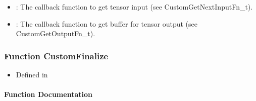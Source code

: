 \documentclass[letterpaper,10pt,english]{sphinxmanual}
\begin{document}
\begin{fulllineitems}
\begin{description}
\begin{itemize}
\item {} 
: The callback function to get tensor input (see CustomGetNextInputFn\_t). 

\item {} 
: The callback function to get buffer for tensor output (see CustomGetOutputFn\_t). 

\end{itemize}

\end{description}


\end{fulllineitems}



\subsubsection{Function CustomFinalize}
\label{\detokenize{cpp_api/function_custom_8h_1a9cd799dfef77db82babc6ddd4a4be707:function-customfinalize}}\label{\detokenize{cpp_api/function_custom_8h_1a9cd799dfef77db82babc6ddd4a4be707:exhale-function-custom-8h-1a9cd799dfef77db82babc6ddd4a4be707}}\label{\detokenize{cpp_api/function_custom_8h_1a9cd799dfef77db82babc6ddd4a4be707::doc}}\begin{itemize}
\item {} 
Defined in {\hyperref[\detokenize{cpp_api/file_src_servables_custom_custom.h:file-src-servables-custom-custom-h}]{}}

\end{itemize}


\paragraph{Function Documentation}
\label{\detokenize{cpp_api/function_custom_8h_1a9cd799dfef77db82babc6ddd4a4be707:function-documentation}}
\end{document}
